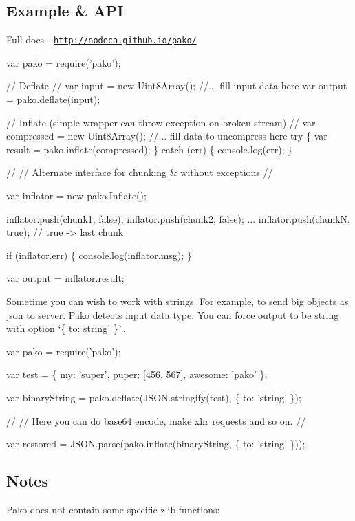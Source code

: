 \subsection*{Example \& A\+PI }

Full docs -\/ \href{http://nodeca.github.io/pako/}{\tt http\+://nodeca.\+github.\+io/pako/}


\begin{DoxyCode}
var pako = require('pako');

// Deflate
//
var input = new Uint8Array();
//... fill input data here
var output = pako.deflate(input);

// Inflate (simple wrapper can throw exception on broken stream)
//
var compressed = new Uint8Array();
//... fill data to uncompress here
try \{
  var result = pako.inflate(compressed);
\} catch (err) \{
  console.log(err);
\}

//
// Alternate interface for chunking & without exceptions
//

var inflator = new pako.Inflate();

inflator.push(chunk1, false);
inflator.push(chunk2, false);
...
inflator.push(chunkN, true); // true -> last chunk

if (inflator.err) \{
  console.log(inflator.msg);
\}

var output = inflator.result;
\end{DoxyCode}


Sometime you can wish to work with strings. For example, to send big objects as json to server. Pako detects input data type. You can force output to be string with option `\{ to\+: \textquotesingle{}string' \}\`{}.


\begin{DoxyCode}
var pako = require('pako');

var test = \{ my: 'super', puper: [456, 567], awesome: 'pako' \};

var binaryString = pako.deflate(JSON.stringify(test), \{ to: 'string' \});

//
// Here you can do base64 encode, make xhr requests and so on.
//

var restored = JSON.parse(pako.inflate(binaryString, \{ to: 'string' \}));
\end{DoxyCode}


\subsection*{Notes }

Pako does not contain some specific zlib functions\+:


